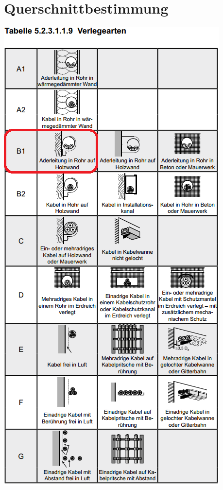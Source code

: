 \chapter{Querschnittbestimmung}\label{app:nin}
\newpage\begin{landscape}
\begin{minipage}{0.35\textwidth}
		\includegraphics[height=.90\textheight]{images/NIN_Art.png}

\end{minipage}
\end{landscape}
